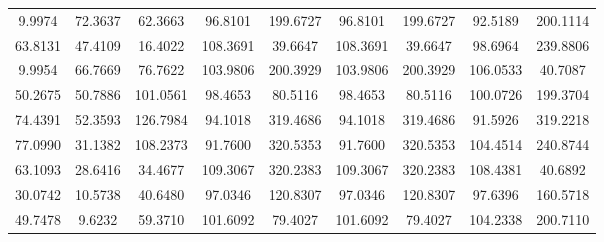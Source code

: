 \documentclass[withoutpreface,bwprint]{cumcmthesis}
\begin{document}
\begin{appendices}
\begin{table}[htbp!]
\begin{tabular}{@{}ccccccccc@{}}
				9.9974         & 72.3637        & 62.3663     & 96.8101     & 199.6727    & 96.8101         & 199.6727        & 92.5189         & 200.1114        \\
				63.8131        & 47.4109        & 16.4022     & 108.3691    & 39.6647     & 108.3691        & 39.6647         & 98.6964         & 239.8806        \\
				9.9954         & 66.7669        & 76.7622     & 103.9806    & 200.3929    & 103.9806        & 200.3929        & 106.0533        & 40.7087         \\
				50.2675        & 50.7886        & 101.0561    & 98.4653     & 80.5116     & 98.4653         & 80.5116         & 100.0726        & 199.3704        \\
				74.4391        & 52.3593        & 126.7984    & 94.1018     & 319.4686    & 94.1018         & 319.4686        & 91.5926         & 319.2218        \\
				77.0990        & 31.1382        & 108.2373    & 91.7600     & 320.5353    & 91.7600         & 320.5353        & 104.4514        & 240.8744        \\
				63.1093        & 28.6416        & 34.4677     & 109.3067    & 320.2383    & 109.3067        & 320.2383        & 108.4381        & 40.6892         \\
				30.0742        & 10.5738        & 40.6480     & 97.0346     & 120.8307    & 97.0346         & 120.8307        & 97.6396         & 160.5718        \\
				49.7478        & 9.6232         & 59.3710     & 101.6092    & 79.4027     & 101.6092        & 79.4027         & 104.2338        & 200.7110        \\ \bottomrule
			\end{tabular}
		\end{table}
		
		
		

\end{appendices}
\end{document}
